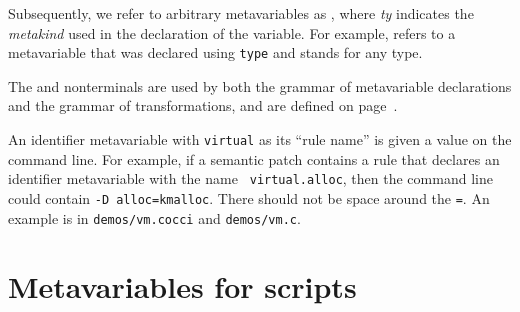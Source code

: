 \begin{grammar}


    







\end{grammar}

Subsequently, we refer to arbitrary metavariables as
, where {\it{ty}}
indicates the {\it metakind} used in the declaration of the variable.
For example,  refers to a metavariable
that was declared using \texttt{type} and stands for any type.

The  and  nonterminals are used by both the grammar of
metavariable declarations and the grammar of transformations, and are
defined on page~\pageref{types}.

An identifier metavariable with {\tt virtual} as its ``rule name'' is given
a value on the command line.  For example, if a semantic patch contains a
rule that declares an identifier metavariable with the name {\tt
  virtual.alloc}, then the command line could contain {\tt -D
  alloc=kmalloc}.  There should not be space around the {\tt =}.  An
example is in {\tt demos/vm.cocci} and {\tt demos/vm.c}.

\section{Metavariables for scripts}

